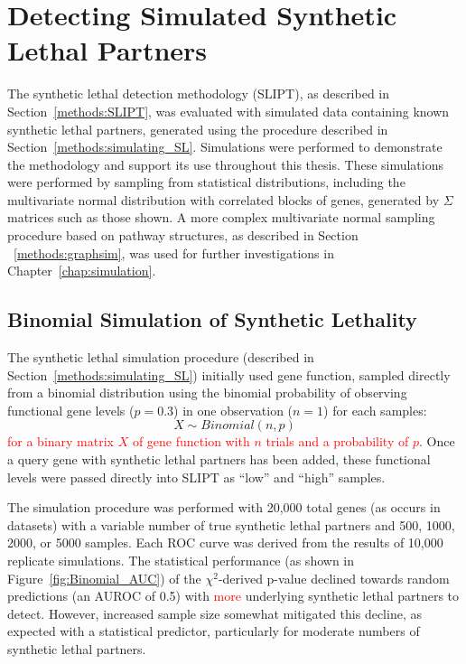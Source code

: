 \FloatBarrier

\section{Detecting Simulated Synthetic Lethal Partners} \label{chapt2:simulation_2015}

The \gls{synthetic lethal} detection methodology (\gls{SLIPT}), as described in Section~\ref{methods:SLIPT}, was evaluated with simulated data containing known \gls{synthetic lethal} partners, generated using the procedure described in Section~\ref{methods:simulating_SL}. Simulations were performed to demonstrate the methodology and support its use throughout this thesis. These simulations were performed by sampling from statistical distributions, including the multivariate normal distribution with correlated blocks of genes, generated by $\Sigma$ matrices such as those shown. A more complex multivariate normal sampling procedure based on pathway  structures, as described in Section ~\ref{methods:graphsim}, was used for further investigations in Chapter~\ref{chap:simulation}. 

\subsection{Binomial Simulation of Synthetic Lethality} \label{chapt2:simulation_binom}

The \gls{synthetic lethal} simulation procedure (described in Section~\ref{methods:simulating_SL}) initially used gene function, sampled directly from a binomial distribution using the binomial probability of observing functional gene levels ($p = 0.3$) in one observation ($n = 1$) for each samples: $$X\sim Binomial(n,p)$$ \textcolor{red}{for a binary matrix $X$ of gene function with $n$ trials and a probability of $p$}. Once a query gene with \gls{synthetic lethal} partners has been added, these functional levels were passed directly into \gls{SLIPT} as ``low'' and ``high'' samples.

The simulation procedure was performed with 20,000 total genes (as occurs in  datasets) with a variable number of true \gls{synthetic lethal} partners and 500, 1000, 2000, or 5000 samples. Each \gls{ROC} curve was derived from the results of 10,000 replicate simulations. The statistical performance (as shown in Figure~\ref{fig:Binomial_AUC}) of the $\chi^2$-derived p-value declined towards random predictions (an \gls{AUROC} of 0.5) with \textcolor{red}{more} underlying \gls{synthetic lethal} partners to detect. However, increased sample size somewhat mitigated this decline, as expected with a statistical predictor, particularly for moderate numbers of \gls{synthetic lethal} partners. 

